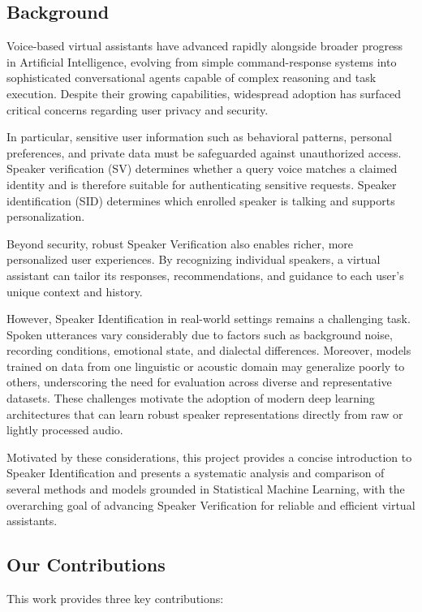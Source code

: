 \subsection{Background}

Voice-based virtual assistants have advanced rapidly alongside broader progress in Artificial Intelligence, evolving from simple command-response systems into sophisticated conversational agents capable of complex reasoning and task execution. Despite their growing capabilities, widespread adoption has surfaced critical concerns regarding user privacy and security.

In particular, sensitive user information such as behavioral patterns, personal preferences, and private data must be safeguarded against unauthorized access. Speaker verification (SV) determines whether a query voice matches a claimed identity and is therefore suitable for authenticating sensitive requests. Speaker identification (SID) determines which enrolled speaker is talking and supports personalization.

Beyond security, robust Speaker Verification also enables richer, more personalized user experiences. By recognizing individual speakers, a virtual assistant can tailor its responses, recommendations, and guidance to each user's unique context and history.

However, Speaker Identification in real-world settings remains a challenging task. Spoken utterances vary considerably due to factors such as background noise, recording conditions, emotional state, and dialectal differences. Moreover, models trained on data from one linguistic or acoustic domain may generalize poorly to others, underscoring the need for evaluation across diverse and representative datasets. These challenges motivate the adoption of modern deep learning architectures that can learn robust speaker representations directly from raw or lightly processed audio.

Motivated by these considerations, this project provides a concise introduction to Speaker Identification and presents a systematic analysis and comparison of several methods and models grounded in Statistical Machine Learning, with the overarching goal of advancing Speaker Verification for reliable and efficient virtual assistants.

\subsection{Our Contributions}
This work provides three key contributions:

